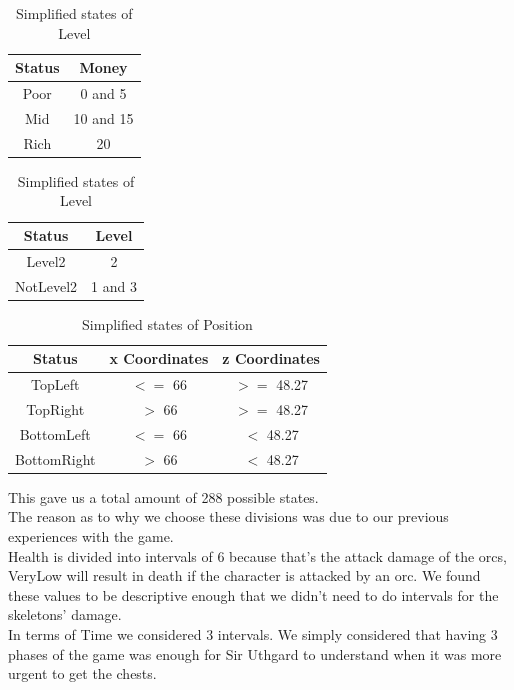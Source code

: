 \documentclass{article}
\begin{document}
  \begin{table}[h!]
    \parbox{.45\linewidth}{
      \centering
      \caption{Simplified states of Money}
      \label{tab:moneyStates}
      \begin{tabular}{c|c}
        \textbf{Status} & \textbf{Money}\\
        \hline
        Poor & 0 and 5\\
        Mid & 10 and 15\\
        Rich & 20\\
      \end{tabular}
    }
    \hfil
    \parbox{.45\linewidth}{
      \centering
      \caption{Simplified states of Level}
      \label{tab:levelStates}
      \begin{tabular}{c|c}
        \textbf{Status} & \textbf{Level}\\
        \hline
        Level2 & 2\\
        NotLevel2 & 1 and 3\\
      \end{tabular}
    }
  \end{table}
  \begin{table}[h!]
    \centering
    \caption{Simplified states of Position}
    \label{tab:positionStates}
    \begin{tabular}{c|c|c}
      \textbf{Status} & \textbf{x Coordinates} & \textbf{z Coordinates}\\
      \hline
      TopLeft & $<=$ 66 & $>=$ 48.27\\
      TopRight & $>$ 66 & $>=$ 48.27\\
      BottomLeft & $<=$ 66 & $<$ 48.27\\
      BottomRight & $>$ 66 & $<$ 48.27\\
    \end{tabular}
  \end{table}
  \noindent
  This gave us a total amount of 288 possible states.\\
  The reason as to why we choose these divisions was due to our previous experiences with the game.\\
  Health is divided into intervals of 6 because that's the attack damage of the orcs, VeryLow will result in death if the
  character is attacked by an orc. We found these values to be descriptive enough that we
  didn't need to do intervals for the skeletons' damage.\\
  In terms of Time we considered 3 intervals. We simply considered that having 3 phases of the game was enough for Sir Uthgard to understand when it was more urgent to get the chests.\\
\end{document}
